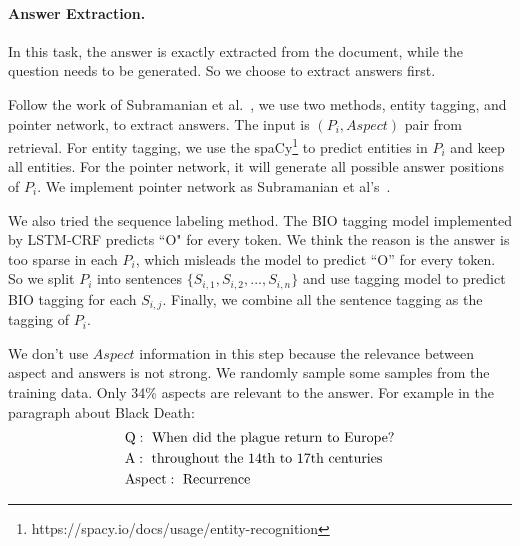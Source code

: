 \paragraph{Answer Extraction.} In this task, the answer is exactly extracted from the document, while the question needs to be generated. So we choose to extract answers first. 

Follow the work of Subramanian et al.~, we use two methods, entity tagging, and pointer network, to extract answers.
The input is $(P_i, Aspect)$ pair from retrieval. For entity tagging, we use the spaCy\footnote{https://spacy.io/docs/usage/entity-recognition} to predict entities in $P_i$ and keep all entities. For the pointer network, it will generate all possible answer positions of $P_i$. We implement pointer network as Subramanian et al's~. 

We also tried the sequence labeling method. The BIO tagging model implemented by LSTM-CRF predicts ``O" for every token. We think the reason is the answer is too sparse in each $P_i$, which misleads the model to predict ``O'' for every token. So we split $P_i$ into sentences $\{S_{i,1}, S_{i,2}, ..., S_{i,n}\}$ and use tagging model to predict BIO tagging for each $S_{i,j}$. Finally, we combine all the sentence tagging as the tagging of $P_i$.

We don't use $Aspect$ information in this step because the relevance between aspect and answers is not strong. We randomly sample some samples from the training data. Only 34\% aspects are relevant to the answer. For example in the paragraph about Black Death:
\begin{equation*}
\begin{aligned}
&{\rm Q:\ When\ did\ the\ plague\ return\ to\ Europe?}\\
&{\rm A:\ throughout\ the\ 14th\ to\ 17th\ centuries}\\
&{\rm Aspect:\ Recurrence}\\
\end{aligned}
\end{equation*}

